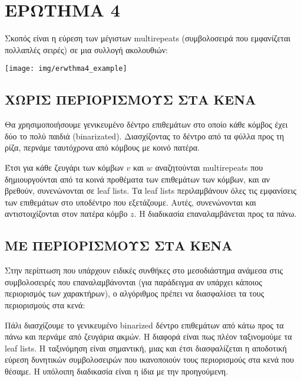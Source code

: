 \chapter{ΕΡΩΤΗΜΑ 4}
    Σκοπός είναι η εύρεση των μέγιστων multirepeats (συμβολοσειρά που εμφανίζεται πολλαπλές σειρές) σε μια συλλογή ακολουθιών: \cite{Bakalis_2006}
    \vspace{-10pt}
    \begin{center} \noindent
        \texttt{[image: img/erwthma4\_example]}
    \end{center}

    \section{ΧΩΡΙΣ ΠΕΡΙΟΡΙΣΜΟΥΣ ΣΤΑ ΚΕΝΑ}
    Θα χρησιμοποιήσουμε γενικευμένο δέντρο επιθεμάτων στο οποίο κάθε κόμβος έχει δύο το πολύ παιδιά (binarizated).
    Διασχίζοντας το δέντρο από τα φύλλα προς τη ρίζα, περνάμε ταυτόχρονα από κόμβους με κοινό πατέρα.

    Έτσι για κάθε ζευγάρι των κόμβων \(v\) και \(w\) αναζητούνται multirepeats που δημιουργούνται από τα κοινά προθέματα των επιθεμάτων των κόμβων, και αν βρεθούν, συνενώνονται σε leaf lists.
    Τα leaf lists περιλαμβάνουν όλες τις εμφανίσεις των επιθεμάτων στο υποδέντρο που εξετάζουμε.
    Αυτές, συνενώνονται και αντιστοιχίζονται στον πατέρα κόμβο \(z\).
    Η διαδικασία επαναλαμβάνεται προς τα πάνω.

    \section{ΜΕ ΠΕΡΙΟΡΙΣΜΟΥΣ ΣΤΑ ΚΕΝΑ}
    Στην περίπτωση που υπάρχουν ειδικές συνθήκες στο μεσοδιάστημα ανάμεσα στις συμβολοσειρές που επαναλαμβάνονται (για παράδειγμα αν υπάρχει κάποιος περιορισμός των χαρακτήρων), ο αλγόριθμος πρέπει να διασφαλίσει τα τους περιορισμούς στα κενά:

    Πάλι διασχίζουμε το γενικευμένο binarized δέντρο επιθεμάτων από κάτω προς τα πάνω και περνάμε από ζευγάρια ακμών.
    Η διαφορά είναι πως πλέον ταξινομούμε τα leaf lists.
    Η ταξινόμηση είναι σημαντική, μιας και έτσι διασφαλίζεται η αποδοτική εύρεση δυνητικών συμβολοσειρών που ικανοποιούν τους περιορισμούς στα κενά που θέσαμε.
    Η υπόλοιπη διαδικασία είναι η ίδια με την προηγούμενη.
